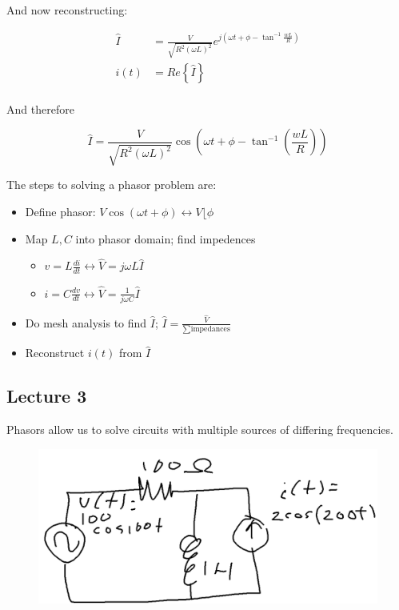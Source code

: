 \documentclass[../notes.tex]{subfiles}
\begin{document}
And now reconstructing:

\begin{equation}
	\begin{split}
		\hat{I} &= \frac{V}{\sqrt{R^2 (\omega L)^2}} e^{j(\omega t + \phi - \tan^{-1}{\frac{wL}{R}})} \\
		 i(t) &= Re \left\{ \hat{I} \right\}   \\
	\end{split}
\end{equation}

And therefore

\begin{equation}
	\hat{I} = \frac{V}{\sqrt{R^2 (\omega L)^2}} \cos{(\omega t + \phi - \tan^{-1}(\frac{wL}{R}))}
\end{equation}


The steps to solving a phasor problem are:
\begin{itemize}
	\item Define phasor: $ V \cos{(\omega t + \phi)} \leftrightarrow V\lfloor\phi $ 
	\item Map $ L, C $ into phasor domain; find impedences
		\begin{itemize}
			\item $ v = L \frac{di}{dt} \leftrightarrow \hat{V} = j \omega L \hat{I} $ 
			\item $ i = C \frac{dv}{dt} \leftrightarrow \hat{V} = \frac{1}{j \omega C }\hat{I} $ 
		\end{itemize}
	\item Do mesh analysis to find $ \hat{I} $; $ \hat{I} = \frac{\hat{V}}{\sum \text{impedances} } $ 
	\item Reconstruct $ i(t) $ from $ \hat{I} $ 
\end{itemize}


\subsection{Lecture 3}

Phasors allow us to solve circuits with multiple sources of differing frequencies.



\begin{figure}[H]
	\centering
	\includegraphics[width=0.8\linewidth]{img/image_2022-09-12-11-19-00.png}
\end{figure}
\end{document}
